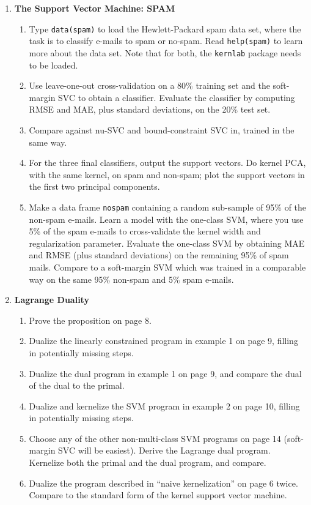 \documentclass[a4paper,10pt,oneside]{article}
\begin{document}
\begin{enumerate}
\item {\bf The Support Vector Machine: SPAM}
\begin{enumerate}
\item Type \texttt{data(spam)} to load the Hewlett-Packard spam data set, where the task is to classify e-mails to spam or no-spam. Read \texttt{help(spam)} to learn more about the data set. Note that for both, the \texttt{kernlab} package needs to be loaded.
\item Use leave-one-out cross-validation on a 80\% training set and the soft-margin SVC to obtain a classifier. Evaluate the classifier by computing RMSE and MAE, plus standard deviations, on the 20\% test set.
\item Compare against nu-SVC and bound-constraint SVC in, trained in the same way.
\item For the three final classifiers, output the support vectors. Do kernel PCA, with the same kernel, on spam and non-spam; plot the support vectors in the first two principal components.
\item Make a data frame \texttt{nospam} containing a random sub-sample of 95\% of the non-spam e-mails. Learn a model with the one-class SVM, where you use 5\% of the spam e-mails to cross-validate the kernel width and regularization parameter. Evaluate the one-class SVM by obtaining MAE and RMSE (plus standard deviations) on the remaining 95\% of spam mails. Compare to a soft-margin SVM which was trained in a comparable way on the same 95\% non-spam and 5\% spam e-mails.
\end{enumerate}


\item {\bf Lagrange Duality}
\begin{enumerate}
\item Prove the proposition on page 8.
\item Dualize the linearly constrained program in example 1 on page 9, filling in potentially missing steps.
\item Dualize the dual program in example 1 on page 9, and compare the dual of the dual to the primal.
\item Dualize and kernelize the SVM program in example 2 on page 10, filling in potentially missing steps.
\item Choose any of the other non-multi-class SVM programs on page 14 (soft-margin SVC will be easiest). Derive the Lagrange dual program. Kernelize both the primal and the dual program, and compare.
\item Dualize the program described in ``naive kernelization'' on page 6 twice. Compare to the standard form of the kernel support vector machine.
\end{enumerate}


\end{enumerate}
\end{document}
